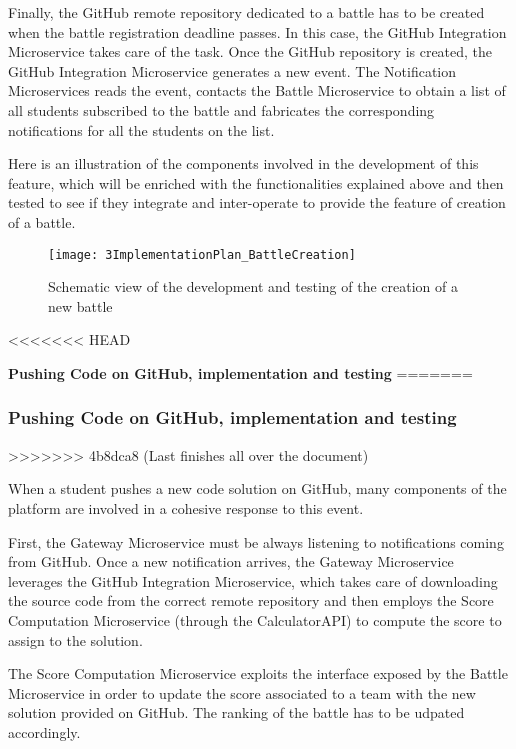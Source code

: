 Finally, the GitHub remote repository dedicated to a battle has to be created when the battle registration deadline passes. In this case, the GitHub Integration Microservice takes care of the task. Once the GitHub repository is created, the GitHub Integration Microservice generates a new event. The Notification Microservices reads the event, contacts the Battle Microservice to obtain a list of all students subscribed to the battle and fabricates the corresponding notifications for all the students on the list.

Here is an illustration of the components involved in the development of this feature, which will be enriched with the functionalities explained above and then tested to see if they integrate and inter-operate to provide the feature of creation of a battle.

\begin{figure}[h]
        \centering
	\texttt{[image: 3ImplementationPlan\_BattleCreation]}
        \caption{Schematic view of the development and testing of the creation of a new battle}
\end{figure}

<<<<<<< HEAD
\vspace{0.7cm}

\textbf{Pushing Code on GitHub, implementation and testing}
=======
\newpage
\subsubsection*{Pushing Code on GitHub, implementation and testing}
>>>>>>> 4b8dca8 (Last finishes all over the document)

When a student pushes a new code solution on GitHub, many components of the \app platform are involved in a cohesive response to this event.

First, the Gateway Microservice must be always listening to notifications coming from GitHub. Once a new notification arrives, the Gateway Microservice leverages the GitHub Integration Microservice, which takes care of downloading the source code from the correct remote repository and then employs the Score Computation Microservice (through the CalculatorAPI) to compute the score to assign to the solution.

The Score Computation Microservice exploits the interface exposed by the Battle Microservice in order to update the score associated to a team with the new solution provided on GitHub. The ranking of the battle has to be udpated accordingly.


